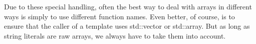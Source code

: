 Due to these special handling, often the best way to deal with arrays in different ways is simply to use different function names. Even better, of course, is to ensure that the caller of a template uses std::vector or std::array. But as long as string literals are raw arrays, we always have to take them into account.


















